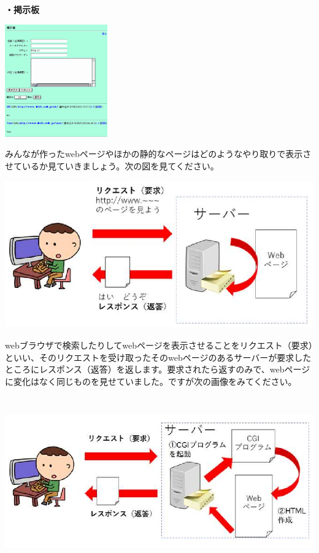 \documentclass[a4paper,12pt,dvipdfmx]{jarticle}
\begin{document}
\bigskip

{\bfseries
	・掲示板}



\centering
\includegraphics[width=4.431cm,height=4.845cm]{ome7-img048.png}
\flushleft





\bigskip

みんなが作ったwebページやほかの静的なページはどのようなやり取りで表示させているか見ていきましょう。次の図を見てください。



\bigskip


\centering
\includegraphics[width=13.827cm,height=6.346cm]{ome7-img049}
\flushleft

\bigskip


webブラウザで検索したりしてwebページを表示させることをリクエスト（要求）といい、そのリクエストを受け取ったそのwebページのあるサーバーが要求したところにレスポンス（返答）を返します。要求されたら返すのみで、webページに変化はなく同じものを見せていました。ですが次の画像をみてください。


\bigskip

\centering
\includegraphics[width=14.065cm,height=7.364cm]{ome7-img050}
\flushleft
\end{document}
